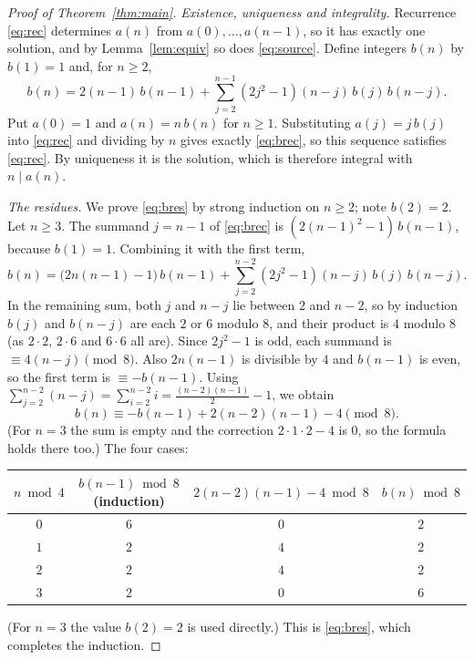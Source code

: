 \documentclass[11pt,a4paper]{article}
\theoremstyle{definition}
\theoremstyle{remark}
\begin{document}
\begin{proof}[Proof of Theorem~\ref{thm:main}]
\emph{Existence, uniqueness and integrality.} Recurrence \eqref{eq:rec} determines $a(n)$ from $a(0),\dots,a(n-1)$, so it
has exactly one solution, and by Lemma~\ref{lem:equiv} so does \eqref{eq:source}. Define integers $b(n)$ by $b(1)=1$ and,
for $n\ge2$,
\begin{equation}\label{eq:brec}
b(n)=2(n-1)\,b(n-1)+\sum_{j=2}^{n-1}(2j^2-1)(n-j)\,b(j)\,b(n-j).
\end{equation}
Put $a(0)=1$ and $a(n)=n\,b(n)$ for $n\ge1$. Substituting $a(j)=j\,b(j)$ into \eqref{eq:rec} and dividing by $n$ gives
exactly \eqref{eq:brec}, so this sequence satisfies \eqref{eq:rec}. By uniqueness it is the solution, which is therefore
integral with $n\mid a(n)$.

\emph{The residues.} We prove \eqref{eq:bres} by strong induction on $n\ge2$; note $b(2)=2$. Let $n\ge3$. The summand
$j=n-1$ of \eqref{eq:brec} is $(2(n-1)^2-1)\,b(n-1)$, because $b(1)=1$. Combining it with the first term,
\begin{equation}\label{eq:split}
b(n)=\bigl(2n(n-1)-1\bigr)\,b(n-1)+\sum_{j=2}^{n-2}(2j^2-1)(n-j)\,b(j)\,b(n-j).
\end{equation}
In the remaining sum, both $j$ and $n-j$ lie between $2$ and $n-2$, so by induction $b(j)$ and $b(n-j)$ are each $2$ or
$6$ modulo $8$, and their product is $4$ modulo $8$ (as $2\cdot2$, $2\cdot6$ and $6\cdot6$ all are). Since $2j^2-1$ is odd,
each summand is $\equiv4(n-j)\pmod8$. Also $2n(n-1)$ is divisible by $4$ and $b(n-1)$ is even, so the first term is
$\equiv-b(n-1)$. Using $\sum_{j=2}^{n-2}(n-j)=\sum_{i=2}^{n-2}i=\frac{(n-2)(n-1)}2-1$, we obtain
\[
b(n)\equiv-b(n-1)+2(n-2)(n-1)-4\pmod 8 .
\]
(For $n=3$ the sum is empty and the correction $2\cdot1\cdot2-4$ is $0$, so the formula holds there too.) The four cases:
\begin{center}\small\renewcommand{\arraystretch}{1.2}
\begin{tabular}{cccc}
\toprule
$n\bmod4$ & $b(n-1)\bmod8$ (induction) & $2(n-2)(n-1)-4\bmod8$ & $b(n)\bmod8$\\
\midrule
$0$ & $6$ & $0$ & $2$\\
$1$ & $2$ & $4$ & $2$\\
$2$ & $2$ & $4$ & $2$\\
$3$ & $2$ & $0$ & $6$\\
\bottomrule
\end{tabular}
\end{center}
(For $n=3$ the value $b(2)=2$ is used directly.) This is \eqref{eq:bres}, which completes the induction.
\end{proof}
\end{document}
